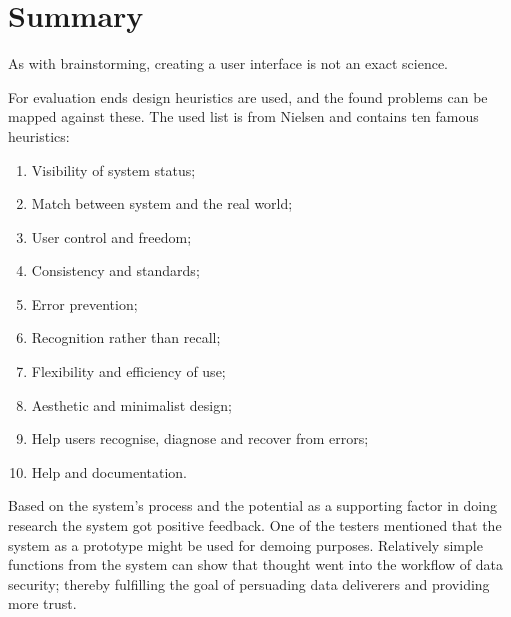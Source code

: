 \section{Summary}
\label{evaluation-summary}

As with brainstorming, creating a user interface is not an exact science.

For evaluation ends design heuristics are used, and the found problems can be mapped against these.
The used list is from Nielsen \cite{designHeuristics} and contains ten famous heuristics:

\begin{enumerate}
	\item Visibility of system status;
	\item Match between system and the real world;
	\item User control and freedom;
	\item Consistency and standards;
	\item Error prevention;
	\item Recognition rather than recall;
	\item Flexibility and efficiency of use;
	\item Aesthetic and minimalist design;
	\item Help users recognise, diagnose and recover from errors;
	\item Help and documentation.
\end{enumerate}


\noindent{} Based on the system's process and the potential as a supporting factor in doing research the system got positive feedback.
One of the testers mentioned that the system as a prototype might be used for demoing purposes.
Relatively simple functions from the system can show that thought went into the workflow of data security;
thereby fulfilling the goal of persuading data deliverers and providing more trust.

